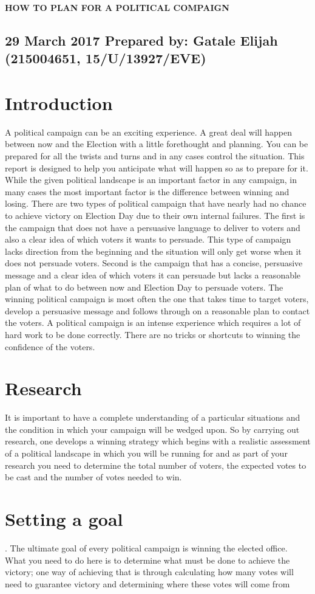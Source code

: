 \documentclass[options]{article}
\begin{document}
\textbf{HOW TO PLAN FOR A POLITICAL COMPAIGN}
\subsection{\textbf{29 March 2017
Prepared by: 
Gatale Elijah (215004651, 15/U/13927/EVE)}}
\section{\textbf{
Introduction}}
A political campaign can be an exciting experience. A great deal will happen between now and the Election with a little forethought and planning. You can be prepared for all the twists and turns and in any cases control the situation. This report is designed to help you anticipate what will happen so as to prepare for it. 
While the given political landscape is an important factor in any campaign, in many cases the most important factor is the difference between winning and losing. 
There are two types of political campaign that have nearly had no chance to achieve victory on Election Day due to their own internal failures.
The first is the campaign that does not have a persuasive language to deliver to voters and also a clear idea of which voters it wants to persuade. This type of campaign lacks direction from the beginning and the situation will only get worse when it does not persuade voters.
Second is the campaign that has a concise, persuasive message and a clear idea of which voters it can persuade but lacks a reasonable plan of what to do between now and Election Day to persuade voters.  
The winning political campaign is most often the one that takes time to target voters, develop a persuasive message and follows through on a reasonable plan to contact the voters.
A political campaign is an intense experience which requires a lot of hard work to be done correctly. There are no tricks or shortcuts to winning the confidence of the voters.
\section{\textbf{	Research}}
It is important to have a complete understanding of a particular situations and the condition in which your campaign will be wedged upon. So by carrying out research, one develops a winning strategy which begins with a realistic assessment of a political landscape in which you will be running for and as part of your research you need to determine the total number of voters, the expected votes to be cast and the number of votes needed to win.
\section{\textbf {Setting a goal}}.
The ultimate goal of every political campaign is winning the elected office. What you need to do here is to determine what must be done to achieve the victory; one way of achieving that is through calculating how many votes will need to guarantee victory and determining where these votes will come from
\end{document}
